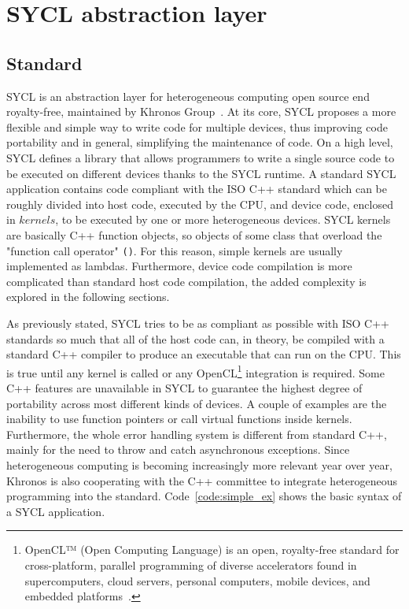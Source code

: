 \chapter{SYCL abstraction layer}
\label{ch:2}
\section{Standard}
\label{ch:sycl_standard}
SYCL is an abstraction layer for heterogeneous computing open source end royalty-free, maintained by Khronos Group~\cite{khronos}. At its core, SYCL proposes a more flexible and simple way to write code for multiple devices, thus improving code portability and in general, simplifying the maintenance of code. On a high level, SYCL defines a library that allows programmers to write a single source code to be executed on different devices thanks to the SYCL runtime. A standard SYCL application contains code compliant with the ISO C++ standard which can be roughly divided into host code, executed by the CPU, and device code, enclosed in $kernels$, to be executed by one or more heterogeneous devices. SYCL kernels are basically C++ function objects, so objects of some class that overload the "function call operator" \texttt{()}. For this reason, simple kernels are usually implemented as lambdas. Furthermore, device code compilation is more complicated than standard host code compilation, the added complexity is explored in the following sections. 

As previously stated, SYCL tries to be as compliant as possible with ISO C++ standards so much that all of the host code can, in theory, be compiled with a standard C++ compiler to produce an executable that can run on the CPU. This is true until any kernel is called or any OpenCL\footnote{OpenCL™ (Open Computing Language) is an open, royalty-free standard for cross-platform, parallel programming of diverse accelerators found in supercomputers, cloud servers, personal computers, mobile devices, and embedded platforms~\cite{OpenCL}.} integration is required. Some C++ features are unavailable in SYCL to guarantee the highest degree of portability across most different kinds of devices. A couple of examples are the inability to use function pointers or call virtual functions inside kernels. Furthermore, the whole error handling system is different from standard C++, mainly for the need to throw and catch asynchronous exceptions. Since heterogeneous computing is becoming increasingly more relevant year over year, Khronos is also cooperating with the C++ committee to integrate heterogeneous programming into the standard. Code~\ref{code:simple_ex} shows the basic syntax of a SYCL application.

